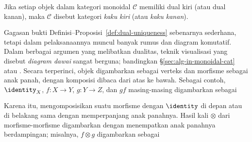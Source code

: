 \begin{definition}\label{def:rigid-cat}
	Jika setiap objek dalam kategori monoidal $\mathcal{C}$ memiliki dual kiri
	(atau dual kanan), maka $\mathcal{C}$ disebut kategori \emph{kaku kiri}
	(atau \emph{kaku kanan}).
\end{definition}

Gagasan bukti Definisi--Proposisi~\ref{def:dual-uniqueness} sebenarnya
sederhana, tetapi dalam pelaksanaannya muncul banyak rumus dan diagram
komutatif. Dalam berbagai argumen yang melibatkan dualitas, teknik visualisasi
yang disebut \emph{diagram dawai} sangat berguna; bandingkan
\S\ref{sec:alg-in-monoidal-cat} atau
\cite[Bukti Teorema 2.6.12]{Li1}. Secara terperinci, objek digambarkan sebagai
verteks dan morfisme sebagai anak panah, dengan komposisi dibaca dari atas ke
bawah. Sebagai contoh, $\identity_X$, $f:X\to Y$, $g:Y\to Z$, dan $gf$
masing-masing digambarkan sebagai
\begin{center}\end{center}

Karena itu, mengomposisikan suatu morfisme dengan $\identity$ di depan atau di
belakang sama dengan memperpanjang anak panahnya. Hasil kali $\otimes$ dari
morfisme-morfisme digambarkan dengan menempatkan anak panahnya berdampingan;
misalnya, $f\otimes g$ digambarkan sebagai
\begin{center}\end{center}

